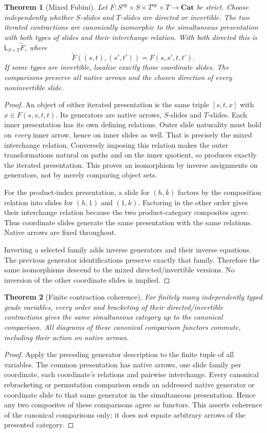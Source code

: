 \documentclass[11pt]{article}
\newtheorem{theorem}{Theorem}
\begin{document}
\begin{theorem}[Mixed Fubini]
Let $F:S^{op}\times S\times T^{op}\times T\to\mathbf{Cat}$ be strict. Choose independently whether $S$-slides and $T$-slides are directed or invertible. The two iterated contractions are canonically isomorphic to the simultaneous presentation with both types of slides and their interchange relation. With both directed this is $\mathsf L_{S\times T}\widetilde F$, where
\[
 \widetilde F((s,t),(s',t'))=F(s,s',t,t').
\]
If some types are invertible, localize exactly those coordinate slides. The comparisons preserve all native arrows and the chosen direction of every noninvertible slide.
\end{theorem}
\begin{proof}
An object of either iterated presentation is the same triple $[s,t,x]$ with $x\in F(s,s,t,t)$. Its generators are native arrows, $S$-slides and $T$-slides. Each inner presentation has its own defining relations. Outer slide naturality must hold on \emph{every} inner arrow, hence on inner slides as well. That is precisely the mixed interchange relation. Conversely imposing this relation makes the outer transformations natural on paths and on the inner quotient, so produces exactly the iterated presentation. This proves an isomorphism by inverse assignments on generators, not by merely comparing object sets.

For the product-index presentation, a slide for $(h,k)$ factors by the composition relation into slides for $(h,1)$ and $(1,k)$. Factoring in the other order gives their interchange relation because the two product-category composites agree. Thus coordinate slides generate the same presentation with the same relations. Native arrows are fixed throughout.

Inverting a selected family adds inverse generators and their inverse equations. The previous generator identifications preserve exactly that family. Therefore the same isomorphisms descend to the mixed directed/invertible versions. No inversion of the other coordinate slides is implied.
\end{proof}

\begin{theorem}[Finite contraction coherence]
For finitely many independently typed grade variables, every order and bracketing of their directed/invertible contractions gives the same simultaneous category up to the canonical comparison. All diagrams of these canonical comparison functors commute, including their action on native arrows.
\end{theorem}
\begin{proof}
Apply the preceding generator description to the finite tuple of all variables. The common presentation has native arrows, one slide family per coordinate, each coordinate's relations and pairwise interchange. Every canonical rebracketing or permutation comparison sends an addressed native generator or coordinate slide to that same generator in the simultaneous presentation. Hence any two composites of these comparisons agree as functors. This asserts coherence of the canonical comparisons only; it does not equate arbitrary arrows of the presented category.
\end{proof}
\end{document}
